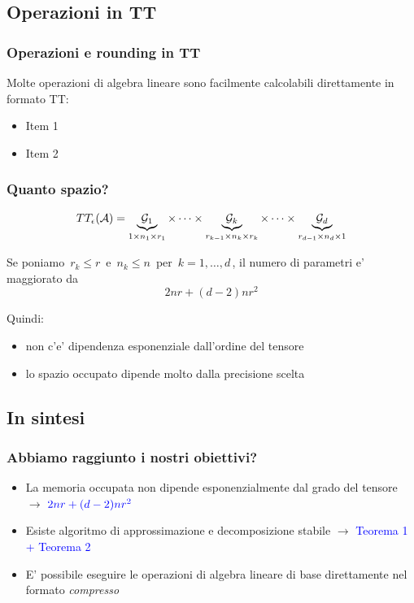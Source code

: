 \documentclass{beamer}
\theoremstyle{definition}
\theoremstyle{plain}
\begin{document}
\subsection{Operazioni in TT}
\begin{frame}
\frametitle{Operazioni e rounding in TT}
Molte operazioni di algebra lineare sono facilmente calcolabili direttamente in formato TT:
\begin{itemize}
\item Item 1
\item Item 2
\end{itemize}
\end{frame}

\begin{frame}
\frametitle{Quanto spazio?}
\begin{equation*}
	TT_\epsilon(\mathcal{A}) = 
	\underbrace{\mathcal{G}_1}_{1 \times n_1 \times r_1}
	\times \cdots \times
	\underbrace{\mathcal{G}_k}_{r_{k-1} \times n_k \times r_k}
	\times \cdots \times 
	\underbrace{\mathcal{G}_d}_{r_{d-1} \times n_d \times 1}
\end{equation*}	

\vspace{5mm}
Se poniamo $\,r_k \leq r\,$ e $\,n_k \leq n\,$ per $\,k = 1,\ldots,d\,$, il numero di parametri e' maggiorato da
\begin{equation*}
	2nr + (d-2)nr^2
\end{equation*}

Quindi:
\begin{itemize}
	\item non c'e' dipendenza esponenziale dall'ordine del tensore
	\item lo spazio occupato dipende molto dalla precisione scelta
\end{itemize}
\end{frame}

\subsection{In sintesi}
\begin{frame}
\frametitle{Abbiamo raggiunto i nostri obiettivi?}
\begin{itemize}
\item La memoria occupata non dipende esponenzialmente dal grado del tensore $\rightarrow$ {$\color{blue} 2nr + (d-2)nr^2$} \color{black}
\item Esiste algoritmo di approssimazione e decomposizione stabile $\rightarrow$ \textcolor{blue}{Teorema 1 + Teorema 2}
\item E' possibile eseguire le operazioni di algebra lineare di base direttamente nel formato \emph{compresso}
\end{itemize}
\end{frame}
\end{document}
